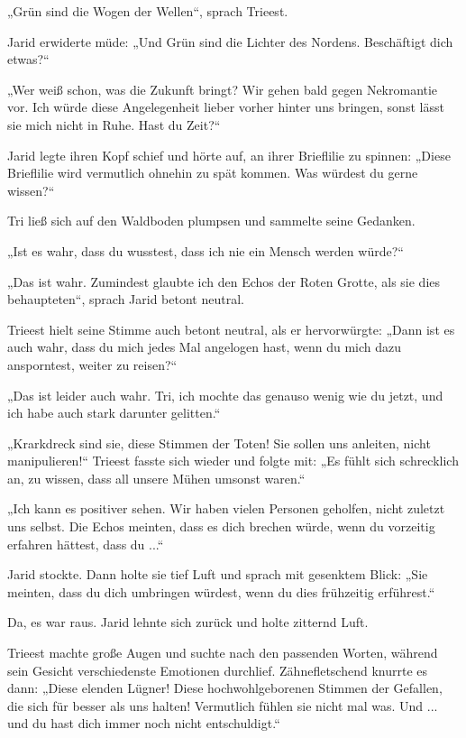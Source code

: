 „Grün sind die Wogen der Wellen“, sprach Trieest.

Jarid erwiderte müde: „Und Grün sind die Lichter des Nordens. Beschäftigt dich etwas?“

„Wer weiß schon, was die Zukunft bringt? Wir gehen bald gegen Nekromantie vor. Ich würde diese Angelegenheit lieber vorher hinter uns bringen, sonst lässt sie mich nicht in Ruhe. Hast du Zeit?“

Jarid legte ihren Kopf schief und hörte auf, an ihrer Brieflilie zu spinnen: „Diese Brieflilie wird vermutlich ohnehin zu spät kommen. Was würdest du gerne wissen?“

Tri ließ sich auf den Waldboden plumpsen und sammelte seine Gedanken.

„Ist es wahr, dass du wusstest, dass ich nie ein Mensch werden würde?“

„Das ist wahr. Zumindest glaubte ich den Echos der Roten Grotte, als sie dies behaupteten“, sprach Jarid betont neutral.

Trieest hielt seine Stimme auch betont neutral, als er hervorwürgte: „Dann ist es auch wahr, dass du mich jedes Mal angelogen hast, wenn du mich dazu ansporntest, weiter zu reisen?“

„Das ist leider auch wahr. Tri, ich mochte das genauso wenig wie du jetzt, und ich habe auch stark darunter gelitten.“

„Krarkdreck sind sie, diese Stimmen der Toten! Sie sollen uns anleiten, nicht manipulieren!“ Trieest fasste sich wieder und folgte mit: „Es fühlt sich schrecklich an, zu wissen, dass all unsere Mühen umsonst waren.“

„Ich kann es positiver sehen. Wir haben vielen Personen geholfen, nicht zuletzt uns selbst. Die Echos meinten, dass es dich brechen würde, wenn du vorzeitig erfahren hättest, dass du ...“

Jarid stockte. Dann holte sie tief Luft und sprach mit gesenktem Blick: „Sie meinten, dass du dich umbringen würdest, wenn du dies frühzeitig erführest.“

Da, es war raus. Jarid lehnte sich zurück und holte zitternd Luft.

Trieest machte große Augen und suchte nach den passenden Worten, während sein Gesicht verschiedenste Emotionen durchlief. Zähnefletschend knurrte es dann: „Diese elenden Lügner! Diese hochwohlgeborenen Stimmen der Gefallen, die sich für besser als uns halten! Vermutlich fühlen sie nicht mal was. Und ... und du hast dich immer noch nicht entschuldigt.“

